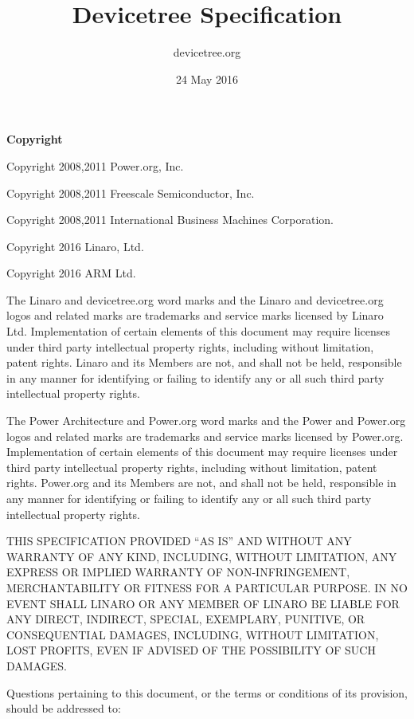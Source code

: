 \documentclass[a4paper,10pt,oneside]{sphinxmanual}
\title{Devicetree Specification}
\date{24 May 2016}
\author{devicetree.org}
\begin{document}
\maketitle
\tableofcontents
{}\label{index::doc}


\textbf{Copyright}

\begin{DUlineblock}{0em}
\item[] Copyright 2008,2011 Power.org, Inc.
\item[] Copyright 2008,2011 Freescale Semiconductor, Inc.
\item[] Copyright 2008,2011 International Business Machines Corporation.
\item[] Copyright 2016 Linaro, Ltd.
\item[] Copyright 2016 ARM Ltd.
\end{DUlineblock}

The Linaro and devicetree.org word marks and the Linaro and
devicetree.org logos and related marks are trademarks and service marks
licensed by Linaro Ltd. Implementation of certain elements of this
document may require licenses under third party intellectual property
rights, including without limitation, patent rights. Linaro and its
Members are not, and shall not be held, responsible in any manner for
identifying or failing to identify any or all such third party
intellectual property rights.

The Power Architecture and Power.org word marks and the Power and
Power.org logos and related marks are trademarks and service marks
licensed by Power.org. Implementation of certain elements of this
document may require licenses under third party intellectual property
rights, including without limitation, patent rights. Power.org and its
Members are not, and shall not be held, responsible in any manner for
identifying or failing to identify any or all such third party
intellectual property rights.

THIS SPECIFICATION PROVIDED ``AS IS'' AND WITHOUT ANY WARRANTY
OF ANY KIND, INCLUDING, WITHOUT LIMITATION, ANY EXPRESS OR IMPLIED
WARRANTY OF NON-INFRINGEMENT, MERCHANTABILITY OR FITNESS FOR A
PARTICULAR PURPOSE. IN NO EVENT SHALL LINARO OR ANY MEMBER OF
LINARO BE LIABLE FOR ANY DIRECT, INDIRECT, SPECIAL, EXEMPLARY,
PUNITIVE, OR CONSEQUENTIAL DAMAGES, INCLUDING, WITHOUT LIMITATION, LOST
PROFITS, EVEN IF ADVISED OF THE POSSIBILITY OF SUCH DAMAGES.

Questions pertaining to this document, or the terms or conditions of its
provision, should be addressed to:
\end{document}
